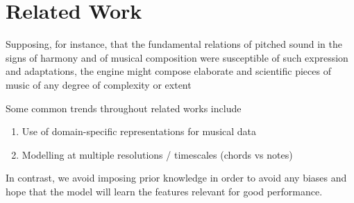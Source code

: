\chapter{Related Work}
\begin{savequote}[75mm]
  Supposing, for instance, that the fundamental relations of pitched sound in the
  signs of harmony and of musical composition were susceptible of such expression and
  adaptations, the engine might compose elaborate and scientific pieces of music
  of any degree of complexity or extent
\end{savequote}




\ifpdf
    \graphicspath{{Chapter3/Figs/Raster/}{Chapter3/Figs/PDF/}{Chapter3/Figs/}}
\else
    \graphicspath{{Chapter3/Figs/Vector/}{Chapter3/Figs/}}
\fi



Some common trends throughout related works include
\begin{enumerate}
  \item Use of domain-specific representations for musical data
  \item Modelling at multiple resolutions / timescales (\ie chords vs notes)
\end{enumerate}
In contrast, we avoid imposing prior knowledge in order to avoid any biases
and hope that the model will learn the features relevant for good performance.

